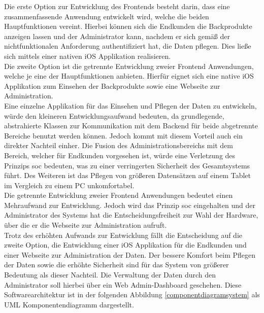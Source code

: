 Die erste Option zur Entwicklung des Frontends besteht darin, dass eine zusammenfassende Anwendung entwickelt wird, welche die beiden Hauptfunktionen vereint. Hierbei können sich die Endkunden die Backprodukte anzeigen lassen und der Administrator kann, nachdem er sich gemäß der nichtfunktionalen Anforderung  authentifiziert hat, die Daten pflegen. Dies ließe sich mittels einer nativen iOS Applikation realisieren.
\\
Die zweite Option ist die getrennte Entwicklung zweier Frontend Anwendungen, welche je eine der Hauptfunktionen anbieten.
Hierfür eignet sich eine native iOS Applikation zum Einsehen der Backprodukte sowie eine Webseite zur Administration.
\\
Eine einzelne Applikation für das Einsehen und Pflegen der Daten zu entwickeln, würde den kleineren Entwicklungsaufwand bedeuten, da grundlegende, abstrahierte Klassen zur Kommunikation mit dem Backend für beide abgetrennte Bereiche benutzt werden können. Jedoch kommt mit diesem Vorteil auch ein direkter Nachteil einher. Die Fusion des Administrationsbereichs mit dem Bereich, welcher für Endkunden vorgesehen ist, würde eine Verletzung des Prinzips \gls{soc} bedeuten, was zu einer verringerten Sicherheit des Gesamtsystems führt. Des Weiteren ist das Pflegen von größeren Datensätzen auf einem Tablet im Vergleich zu einem PC unkomfortabel.
\\
Die getrennte Entwicklung zweier Frontend Anwendungen bedeutet einen Mehraufwand zur Entwicklung. Jedoch wird das Prinzip \gls{soc} eingehalten und der Administrator des Systems hat die Entscheidungsfreiheit zur Wahl der Hardware, über die er die Webseite zur Administration aufruft.
\\
Trotz des erhöhten Aufwands zur Entwicklung fällt die Entscheidung auf die zweite Option, die Entwicklung einer iOS Applikation für die Endkunden und einer Webseite zur Administration der Daten. Der bessere Komfort beim Pflegen der Daten sowie die erhöhte Sicherheit sind für das System von größerer Bedeutung als dieser Nachteil. Die Verwaltung der Daten durch den Administrator soll hierbei über ein Web Admin-Dashboard geschehen. 
Diese Softwarearchitektur ist in der folgenden Abbildung \ref{componentdiagramsystem} als UML Komponentendiagramm dargestellt.


\clearpage


